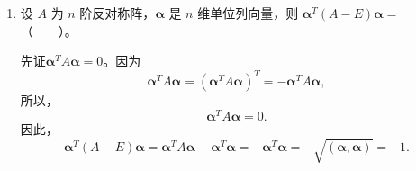\begin{enumerate}[1~]
\begin{enumerate}[1.~]
\begin{solution}
\[\begin{array}{c}
	\frac52\\
	1\\
	\vdots\\
	0\\
	0\\
\end{array}\begin{array}{c}
	0\\
	\frac32\\
	\frac52\\
	\vdots\\
	0\\
	0\\
\end{array}\begin{array}{c}
	\cdots\\
	\cdots\\
	\cdots\\
	\\
	\cdots\\
	\cdots\\
\end{array}\begin{array}{c}
	0\\
	0\\
	0\\
	\vdots\\
	\frac52\\
	1\\
\end{array}\begin{array}{c}
	0\\
	0\\
	0\\
	\vdots\\
	\frac32\\
	\frac52\\
\end{array} \right|
,\]
对于上述命题取$a=1,b=\frac32$，即得\[
D=2^n \frac{1-( \frac32)^{n+1}}{1-\frac32} = 3^{n+1}-2^{n+1}.
\]
\end{solution}

\item
设 $A$ 为 $n$ 阶反对称阵，$\boldsymbol{\alpha}$ 是 $n$ 维单位列向量，则 $\boldsymbol{\alpha}^T (A - E)\boldsymbol{\alpha} = $（\ \ \ \ ）。
\begin{solution}
先证$ \boldsymbol{\alpha} ^T A \boldsymbol{\alpha} = 0$。因为\[
\boldsymbol{\alpha} ^T A \boldsymbol{\alpha} = (\boldsymbol{\alpha} ^T A \boldsymbol{\alpha})^T = -\boldsymbol{\alpha} ^T A \boldsymbol{\alpha},
\]
所以，\[
\boldsymbol{\alpha} ^T A \boldsymbol{\alpha} = 0.
\]
因此，\[
\boldsymbol{\alpha} ^T (A-E) \boldsymbol{\alpha} = \boldsymbol{\alpha} ^T A \boldsymbol{\alpha} - \boldsymbol{\alpha} ^T \boldsymbol{\alpha} = - \boldsymbol{\alpha} ^T \boldsymbol{\alpha} = - \sqrt{(\boldsymbol{\alpha},\boldsymbol{\alpha})} = -1.
\]
\end{solution}


\end{enumerate}
\end{enumerate}
